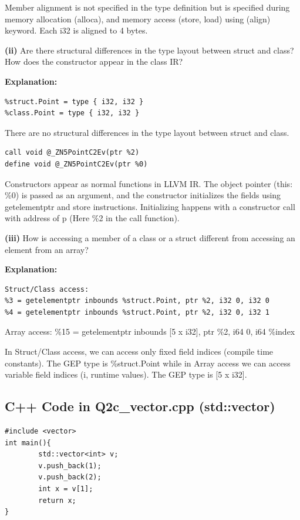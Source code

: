 Member alignment is not specified in the type definition but is specified during memory allocation (alloca), and memory access (store, load) using (align) keyword. Each i32 is aligned to 4 bytes.


\textbf{(ii)} Are there structural differences in the type layout between struct and class? How does the constructor appear in the class IR?


\textbf{Explanation:}


\begin{lstlisting}
%struct.Point = type { i32, i32 }
%class.Point = type { i32, i32 }
\end{lstlisting}

There are no structural differences in the type layout between struct and class. 


\begin{lstlisting}
call void @_ZN5PointC2Ev(ptr %2)
define void @_ZN5PointC2Ev(ptr %0)
\end{lstlisting}

Constructors appear as normal functions in LLVM IR. The object pointer (this: \%0) is passed as an argument, and the constructor initializes the fields using getelementptr and store instructions. Initializing happens with a constructor call with address of p (Here \%2 in the call function).


\textbf{(iii)} How is accessing a member of a class or a struct different from accessing an element from an array?


\textbf{Explanation:} 


\begin{lstlisting}
Struct/Class access:
%3 = getelementptr inbounds %struct.Point, ptr %2, i32 0, i32 0
%4 = getelementptr inbounds %struct.Point, ptr %2, i32 0, i32 1
\end{lstlisting}

Array access: \%15 = getelementptr inbounds [5 x i32], ptr \%2, i64 0, i64 \%index 


In Struct/Class access, we can access only fixed field indices (compile time constants). The GEP type is \%struct.Point while in Array access we can access variable field indices (i, runtime values). The GEP type is [5 x i32].


\subsection{C++ Code in Q2c\_vector.cpp (std::vector)}

\begin{lstlisting}
#include <vector>
int main(){
        std::vector<int> v;
        v.push_back(1);
        v.push_back(2);
        int x = v[1];
        return x;
}
\end{lstlisting}

